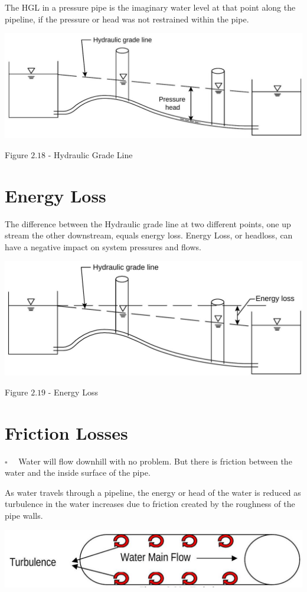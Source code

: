\documentclass[10pt]{article}
\begin{document}
The HGL in a pressure pipe is the imaginary water level at that point along the pipeline, if the pressure or head was not restrained within the pipe.

\includegraphics[max width=\textwidth]{2022_10_30_098bb5f44c5986ff92a9g-30}

Figure $2.18$ - Hydraulic Grade Line

\section{Energy Loss}
The difference between the Hydraulic grade line at two different points, one up stream the other downstream, equals energy loss. Energy Loss, or headloss, can have a negative impact on system pressures and flows.

\includegraphics[max width=\textwidth]{2022_10_30_098bb5f44c5986ff92a9g-31}

Figure $2.19$ - Energy Loss

\section{Friction Losses}
$\square \quad$ Water will flow downhill with no problem. But there is friction between the water and the inside surface of the pipe.

As water travels through a pipeline, the energy or head of the water is reduced as turbulence in the water increases due to friction created by the roughness of the pipe walls.

\includegraphics[max width=\textwidth]{2022_10_30_098bb5f44c5986ff92a9g-31(1)}
\end{document}
